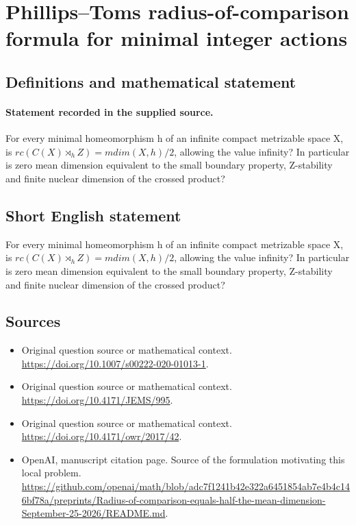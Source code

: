 \documentclass[11pt]{article}
\begin{document}
\section*{Phillips–Toms radius-of-comparison formula for minimal integer actions}\label{30007309}
\subsection{Definitions and mathematical statement}
\paragraph{Statement recorded in the supplied source.}
For every minimal homeomorphism h of an infinite compact metrizable space X, is $rc(C(X)\rtimes _hZ)=mdim(X,h)/2$, allowing the value infinity? In particular is zero mean dimension equivalent to the small boundary property, Z-stability and finite nuclear dimension of the crossed product?
\subsection{Short English statement}
For every minimal homeomorphism h of an infinite compact metrizable space X, is $rc(C(X)\rtimes _hZ)=mdim(X,h)/2$, allowing the value infinity? In particular is zero mean dimension equivalent to the small boundary property, Z-stability and finite nuclear dimension of the crossed product?
\subsection{Sources}
\begin{itemize}
\item[S1] Original question source or mathematical context.
\url{https://doi.org/10.1007/s00222-020-01013-1}.
\item[S2] Original question source or mathematical context.
\url{https://doi.org/10.4171/JEMS/995}.
\item[S3] Original question source or mathematical context.
\url{https://doi.org/10.4171/owr/2017/42}.
\item[S4] OpenAI, manuscript citation page. Source of the formulation motivating this local problem.
\url{https://github.com/openai/math/blob/adc7f1241b42e322a6451854ab7e4b4c146bf78a/preprints/Radius-of-comparison-equals-half-the-mean-dimension-September-25-2026/README.md}.
\end{itemize}
\end{document}
